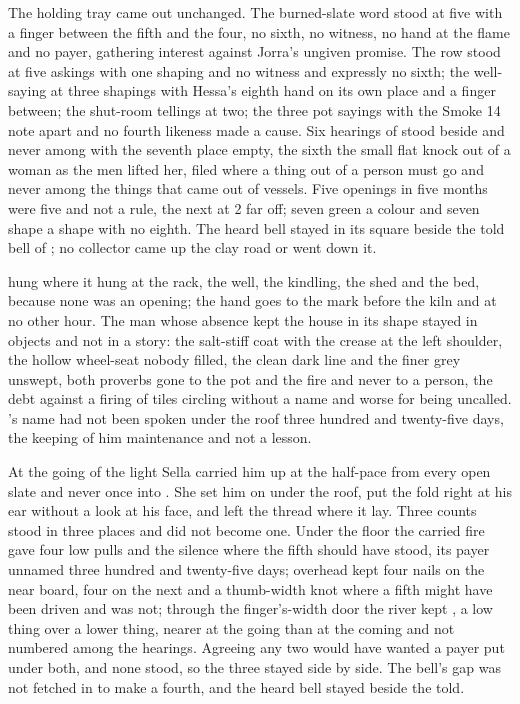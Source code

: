 \scenebreak

The holding tray came out unchanged. The burned-slate word stood at five with a finger between the fifth and the four, no sixth, no witness, no hand at the flame and no payer, gathering interest against Jorra's ungiven promise. The row stood at five askings with one shaping and no witness and expressly no sixth; the well-saying at three shapings with Hessa's eighth hand on its own place and a finger between; the shut-room tellings at two; the three pot sayings with the Smoke 14 note apart and no fourth likeness made a cause. Six hearings of  stood beside and never among with the seventh place empty, the sixth the small flat knock out of a woman as the men lifted her, filed where a thing out of a person must go and never among the things that came out of vessels. Five openings in five months were five and not a rule, the next at  2 far off; seven green a colour and seven shape a shape with no eighth. The heard bell stayed in its square beside the told bell of ; no collector came up the clay road or went down it.

 hung where it hung at the rack, the well, the kindling, the shed and the bed, because none was an opening; the hand goes to the mark before the kiln and at no other hour. The man whose absence kept the house in its shape stayed in objects and not in a story: the salt-stiff coat with the crease at the left shoulder, the hollow wheel-seat nobody filled, the clean dark line and the finer grey unswept, both proverbs gone to the pot and the fire and never to a person, the debt against a firing of tiles circling without a name and worse for being uncalled. 's name had not been spoken under the roof three hundred and twenty-five days, the keeping of him maintenance and not a lesson.

\scenebreak

At the going of the light Sella carried him up at the half-pace from every open slate and never once into . She set him on  under the roof, put the fold right at his ear without a look at his face, and left the thread where it lay. Three counts stood in three places and did not become one. Under the floor the carried fire gave four low pulls and the silence where the fifth should have stood, its payer unnamed three hundred and twenty-five days; overhead  kept four nails on the near board, four on the next and a thumb-width knot where a fifth might have been driven and was not; through the finger's-width door the river kept , a low thing over a lower thing, nearer at the going than at the coming and not numbered among the hearings. Agreeing any two would have wanted a payer put under both, and none stood, so the three stayed side by side. The bell's gap was not fetched in to make a fourth, and the heard bell stayed beside the told.


